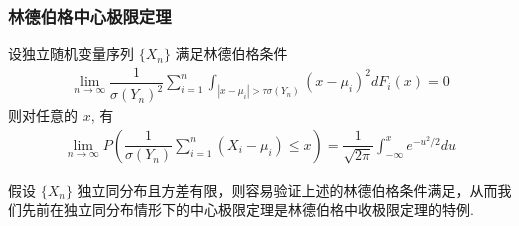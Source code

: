 \begin{frame}
	\frametitle{林德伯格中心极限定理}
	\begin{thm}
		设独立随机变量序列 $\{X_n\}$ 满足林德伯格条件
		\begin{eqnarray}\label{eq:Lindeberg}
			\lim_{n\rightarrow\infty} \dfrac{1}{\sigma(Y_n)^2}\sum_{i=1}^n\int_{|x-\mu_i|>\tau\sigma(Y_n)}(x-\mu_i)^2dF_i(x)=0
		\end{eqnarray} 则对任意的 $x$, 有
		\begin{eqnarray*}
			\lim_{n\rightarrow\infty}P(\dfrac{1}{\sigma(Y_n)}\sum_{i=1}^n(X_i-\mu_i)\le x)=\dfrac{1}{\sqrt{2\pi}}\int_{-\infty}^xe^{-u^2/2}du
		\end{eqnarray*}
	\end{thm}
	\pause
	\begin{rmk}
		假设 $\{X_n\}$ 独立同分布且方差有限，则容易验证上述的林德伯格条件满足，从而我们先前在独立同分布情形下的中心极限定理是林德伯格中收极限定理的特例.
	\end{rmk}
\end{frame}


